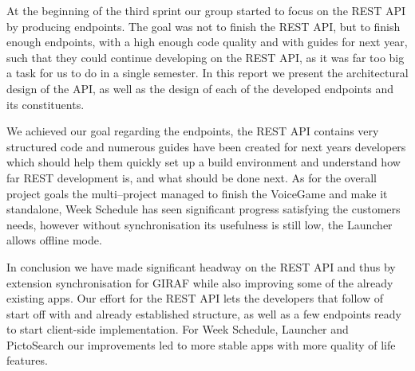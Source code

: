 \bigskip
At the beginning of the third sprint our group started to focus on the REST API by producing endpoints.
The goal was not to finish the REST API, but to finish enough endpoints, with a high enough code quality and with guides for next year, such that they could continue developing on the REST API, as it was far too big a task for us to do in a single semester.
In this report we present the architectural design of the API, as well as the design of each of the developed endpoints and its constituents.

We achieved our goal regarding the endpoints, the REST API contains very structured code and numerous guides have been created for next years developers which should help them quickly set up a build environment and understand how far REST development is, and what should be done next.
As for the overall project goals the multi--project managed to finish the VoiceGame and make it standalone, Week Schedule has seen significant progress satisfying the customers needs, however without synchronisation its usefulness is still low, the Launcher allows offline mode.

In conclusion we have made significant headway on the REST API and thus by extension synchronisation for GIRAF while also improving some of the already existing apps.
Our effort for the REST API lets the developers that follow of start off with and already established structure, as well as a few endpoints ready to start client-side implementation.
For Week Schedule, Launcher and PictoSearch our improvements led to more stable apps with more quality of life features.